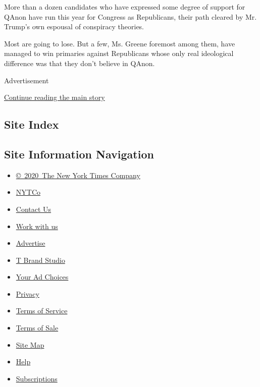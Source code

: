 More than a dozen candidates who have expressed some degree of support
for QAnon have run this year for Congress as Republicans, their path
cleared by Mr. Trump's own espousal of conspiracy theories.

Most are going to lose. But a few, Ms. Greene foremost among them, have
managed to win primaries against Republicans whose only real ideological
difference was that they don't believe in QAnon.

Advertisement

\protect\hyperlink{after-bottom}{Continue reading the main story}

\hypertarget{site-index}{%
\subsection{Site Index}\label{site-index}}

\hypertarget{site-information-navigation}{%
\subsection{Site Information
Navigation}\label{site-information-navigation}}

\begin{itemize}
\tightlist
\item
  \href{https://help.nytimes3xbfgragh.onion/hc/en-us/articles/115014792127-Copyright-notice}{©~2020~The
  New York Times Company}
\end{itemize}

\begin{itemize}
\tightlist
\item
  \href{https://www.nytco.com/}{NYTCo}
\item
  \href{https://help.nytimes3xbfgragh.onion/hc/en-us/articles/115015385887-Contact-Us}{Contact
  Us}
\item
  \href{https://www.nytco.com/careers/}{Work with us}
\item
  \href{https://nytmediakit.com/}{Advertise}
\item
  \href{http://www.tbrandstudio.com/}{T Brand Studio}
\item
  \href{https://www.nytimes3xbfgragh.onion/privacy/cookie-policy\#how-do-i-manage-trackers}{Your
  Ad Choices}
\item
  \href{https://www.nytimes3xbfgragh.onion/privacy}{Privacy}
\item
  \href{https://help.nytimes3xbfgragh.onion/hc/en-us/articles/115014893428-Terms-of-service}{Terms
  of Service}
\item
  \href{https://help.nytimes3xbfgragh.onion/hc/en-us/articles/115014893968-Terms-of-sale}{Terms
  of Sale}
\item
  \href{https://spiderbites.nytimes3xbfgragh.onion}{Site Map}
\item
  \href{https://help.nytimes3xbfgragh.onion/hc/en-us}{Help}
\item
  \href{https://www.nytimes3xbfgragh.onion/subscription?campaignId=37WXW}{Subscriptions}
\end{itemize}
